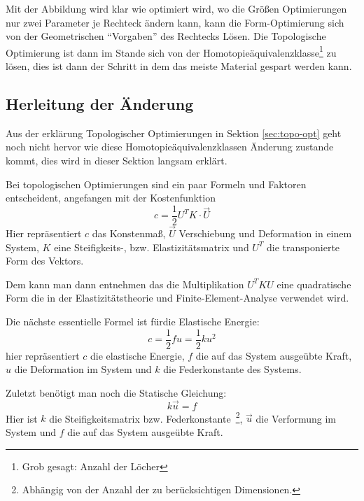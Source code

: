 \documentclass{article}
\begin{document}
Mit der Abbildung wird klar wie optimiert wird, wo die Gr\"o\ss{}en
Optimierungen nur zwei Parameter je Rechteck \"andern kann, kann die
Form-Optimierung sich von der Geometrischen ``Vorgaben'' des Rechtecks L\"osen.
Die Topologische Optimierung ist dann im Stande sich von der
Homotopieäquivalenzklasse\footnote{Grob gesagt: Anzahl der L\"ocher} zu
l\"osen, dies ist dann der Schritt in dem das meiste Material gespart werden kann.

\subsection{Herleitung der \"Anderung}
Aus der erkl\"arung Topologischer Optimierungen in Sektion \ref{sec:topo-opt}
geht noch nicht hervor wie diese Homotopieäquivalenzklassen \"Anderung zustande
kommt, dies wird in dieser Sektion langsam erkl\"art.

Bei topologischen Optimierungen sind ein paar Formeln und Faktoren
entscheident, angefangen mit der Kostenfunktion
\begin{equation}
    c=\frac{1}{2}U^{T}K\cdot \vec{U}
\end{equation}
Hier repr\"asentiert $c$ das Konstenma\ss{}, $\vec{U}$ Verschiebung und
Deformation in einem System, $K$ eine Steifigkeits-, bzw. Elastizit\"atsmatrix
und $U^T$ die transponierte Form des Vektors. 

Dem kann man dann entnehmen das die Multiplikation $U^TKU$ eine quadratische
Form die in der Elastizit\"atstheorie und Finite-Element-Analyse verwendet wird.

Die n\"achste essentielle Formel ist f\"urdie Elastische Energie:
\begin{equation}
   c=\frac{1}{2}fu=\frac{1}{2}ku^2 
\end{equation}
hier repr\"asentiert $c$ die elastische Energie, $f$ die auf das System
ausge\"ubte Kraft, $u$ die Deformation im System und $k$ die Federkonstante des
Systems.

Zuletzt ben\"otigt man noch die Statische Gleichung:
\begin{equation}
    k\vec{u}=f
\end{equation}
Hier ist $k$ die Steifigkeitsmatrix bzw. Federkonstante~\footnote{Abh\"angig
von der Anzahl der zu ber\"ucksichtigen Dimensionen.}, $\vec{u}$ die Verformung
im System und $f$ die auf das System ausge\"ubte Kraft.
\end{document}
